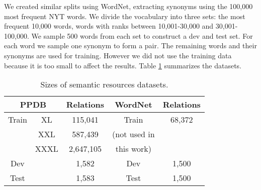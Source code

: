 \documentclass[11pt]{article}
\begin{document}
We created similar splits using WordNet, extracting synonyms using the 100,000 most frequent NYT words.
We divide the vocabulary into three sets: the most frequent 10,000 words, words with ranks between 10,001-30,000 and 30,001-100,000.
We sample 500 words from each set to construct a dev and test set. For each word we sample one synonym 
to form a pair. The remaining words and their synonyms are used for training. 
However we did not use the training data because it is too small to affect the results.
Table \ref{tab:data_stats} summarizes the datasets.

\begin{table}%

\small
\centering
	\begin{tabular}{|cc|c|c|c|}
	\hline
	 \multicolumn{2}{|c|}{\bf PPDB}   & \bf Relations & {\bf WordNet} & {\bf Relations} \\
	\hline
	Train & XL  & 115,041 & Train & 68,372\\
	& XXL & 587,439 & (not used in & \\ %
	& XXXL & 2,647,105 & this work) & \\
	\hline
	Dev &  & 1,582 & Dev & 1,500\\
	Test & & 1,583 & Test & 1,500 \\
	\hline
	\end{tabular}
\caption{Sizes of semantic resources datasets.}
\label{tab:data_stats}
\end{table}


%
%
%
%
%
%
\end{document}
